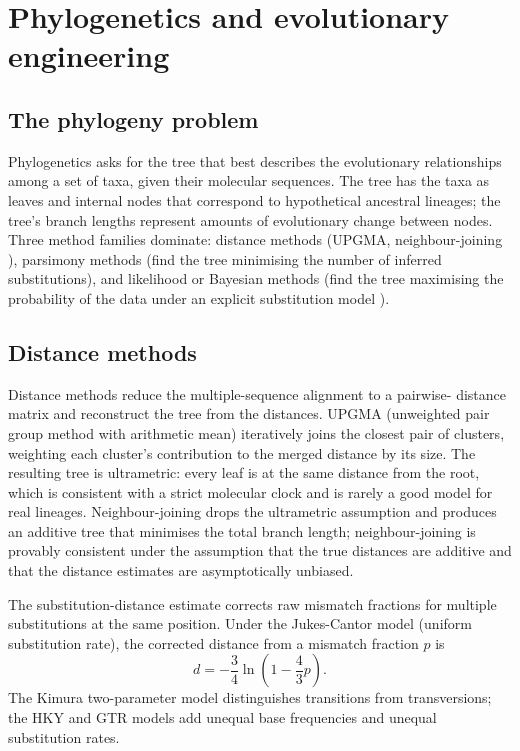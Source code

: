 \section{Phylogenetics and evolutionary engineering}

\subsection{The phylogeny problem}

Phylogenetics asks for the tree that best describes the evolutionary
relationships among a set of taxa, given their molecular sequences.
The tree has the taxa as leaves and internal nodes that correspond to
hypothetical ancestral lineages; the tree's branch lengths represent
amounts of evolutionary change between nodes. Three method families
dominate: distance methods (UPGMA, neighbour-joining
\cite{paper:v6c11-saitou-nj-1987}), parsimony methods (find the tree
minimising the number of inferred substitutions), and likelihood or
Bayesian methods (find the tree maximising the probability of the
data under an explicit substitution model
\cite{paper:v6c11-felsenstein-phylogeny-1981}).

\subsection{Distance methods}

Distance methods reduce the multiple-sequence alignment to a pairwise-
distance matrix and reconstruct the tree from the distances.
UPGMA (unweighted pair group method with arithmetic mean) iteratively
joins the closest pair of clusters, weighting each cluster's
contribution to the merged distance by its size. The resulting tree is
ultrametric: every leaf is at the same distance from the root, which is
consistent with a strict molecular clock and is rarely a good model for
real lineages. Neighbour-joining drops the ultrametric assumption and
produces an additive tree that minimises the total branch length;
neighbour-joining is provably consistent under the assumption that the
true distances are additive and that the distance estimates are
asymptotically unbiased.

The substitution-distance estimate corrects raw mismatch fractions
for multiple substitutions at the same position. Under the Jukes-Cantor
model (uniform substitution rate), the corrected distance from a
mismatch fraction $p$ is
\[
d = -\frac{3}{4} \ln\!\left(1 - \frac{4}{3}p\right).
\]
The Kimura two-parameter model distinguishes transitions from
transversions; the HKY and GTR models add unequal base frequencies and
unequal substitution rates.

